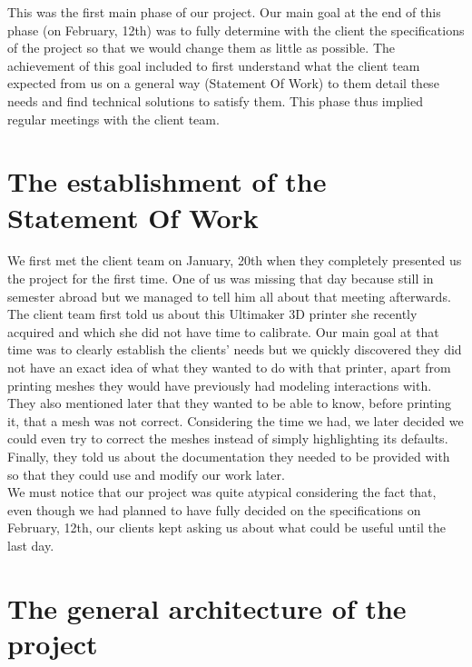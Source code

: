 \documentclass{report}
\begin{document}
This was the first main phase of our project. Our main goal at the end of this phase (on February, 12th) was to fully determine with the client the specifications of the project so that we would change them as little as possible. The achievement of this goal included to first understand what the client team expected from us on a general way (Statement Of Work) to them detail these needs and find technical solutions to satisfy them. This phase thus implied regular meetings with the client team.

\section{The establishment of the Statement Of Work}

We first met the client team on January, 20th when they completely presented us the project for the first time. One of us was missing that day because still in semester abroad but we managed to tell him all about that meeting afterwards.\\

The client team first told us about this Ultimaker 3D printer she recently acquired and which she did not have time to calibrate. Our main goal at that time was to clearly establish the clients' needs but we quickly discovered they did not have an exact idea of what they wanted to do with that printer, apart from printing meshes they would have previously had modeling interactions with.\\

They also mentioned later that they wanted to be able to know, before printing it, that a mesh was not correct. Considering the time we had, we later decided we could even try to correct the meshes instead of simply highlighting its defaults. \\

Finally, they told us about the documentation they needed to be provided with so that they could use and modify our work later. \\

We must notice that our project was quite atypical considering the fact that, even though we had planned to have fully decided on the specifications on February, 12th, our clients kept asking us about what could be useful until the last day.

\section{The general architecture of the project}
\end{document}

